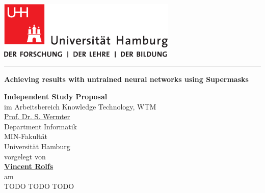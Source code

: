 \documentclass[12pt,final,twoside]{article}
\author{\trauthor}
\makeatletter
\newcommand{\todowarn}{\color{yellow} TODO \color{red} TODO \color{blue} TODO}
\newcommand{\trtitle}{Achieving results with untrained neural networks using Supermasks}
\newcommand{\trtype}{Independent Study Proposal}
\newcommand{\trauthor}{Vincent Rolfs}
\newcommand{\trauthortitle}{} %
\newcommand{\tremail}{vincent.rolfs@studium.uni-hamburg.de}
\newcommand{\trgutachterA}{\href{mailto:wermter@informatik.uni-hamburg.de}{Prof. Dr. S. Wermter}}
\newcommand{\trfach}{Knowledge Technology, WTM}
\newcommand{\trdate}{\todowarn}
\theoremstyle{plain}
\theoremstyle{definition}
\theoremstyle{remark}
\theoremstyle{named}
\makeatother
\begin{document}
\renewcommand{\headheight}{14.5pt}      %

\thispagestyle{empty}
\fancyhead[LO,RE]{}                     %


\begin{titlepage}
    \begin{flushleft}
        \includegraphics[width=85mm]{uhhLogoL.pdf}\\
    \end{flushleft}
    \rule{\textwidth}{0.4pt}
        \newline
        \vspace{2.0cm}
        \begin{center}
          \LARGE \textbf{\trtitle}
        \end{center}
    \vspace{2.0cm}
    \begin{center}
      \textbf{\trtype}\\
      im Arbeitsbereich \trfach\\
      \trgutachterA\medskip\\
      Department Informatik\\
      MIN-Fakult\"at\\
      Universit\"at Hamburg \\[0.5cm]
      vorgelegt von \\
      \textbf{\trauthortitle\href{mailto:\tremail}{\trauthor}}\\
      am\\
      \trdate
    \end{center}

\end{titlepage}
\end{document}
